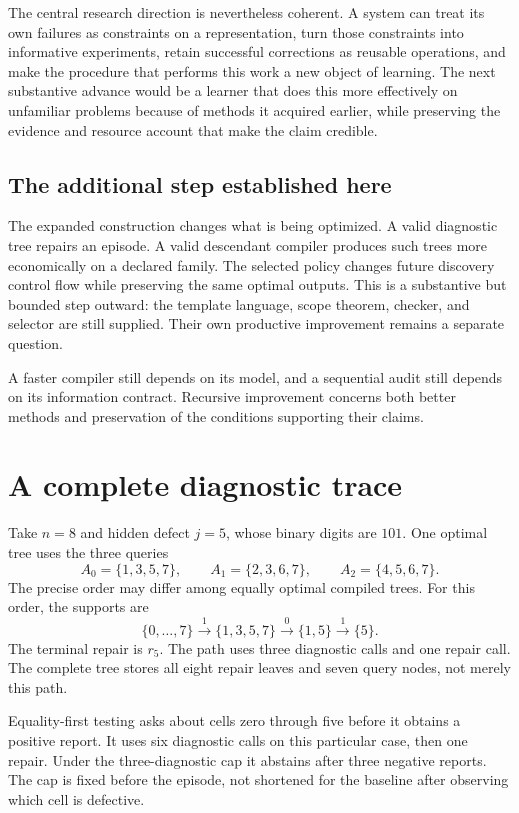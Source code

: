 \documentclass[11pt,letterpaper]{article}
\theoremstyle{plain}
\theoremstyle{definition}
\begin{document}
The central research direction is nevertheless coherent. A system can treat its own failures as constraints on a representation, turn those constraints into informative experiments, retain successful corrections as reusable operations, and make the procedure that performs this work a new object of learning. The next substantive advance would be a learner that does this more effectively on unfamiliar problems because of methods it acquired earlier, while preserving the evidence and resource account that make the claim credible.


\subsection{The additional step established here}
The expanded construction changes what is being optimized. A valid diagnostic tree repairs an episode. A valid descendant compiler produces such trees more economically on a declared family. The selected policy changes future discovery control flow while preserving the same optimal outputs. This is a substantive but bounded step outward: the template language, scope theorem, checker, and selector are still supplied. Their own productive improvement remains a separate question.

A faster compiler still depends on its model, and a sequential audit still depends on its information contract. Recursive improvement concerns both better methods and preservation of the conditions supporting their claims.

\clearpage\appendix
\section{A complete diagnostic trace}\label{app:trace}
Take $n=8$ and hidden defect $j=5$, whose binary digits are $101$. One optimal tree uses the three queries
\[
A_0=\{1,3,5,7\},\qquad A_1=\{2,3,6,7\},\qquad A_2=\{4,5,6,7\}.
\]
The precise order may differ among equally optimal compiled trees. For this order, the supports are
\[
\{0,\ldots,7\}\xrightarrow{1}\{1,3,5,7\}
\xrightarrow{0}\{1,5\}\xrightarrow{1}\{5\}.
\]
The terminal repair is $r_5$. The path uses three diagnostic calls and one repair call. The complete tree stores all eight repair leaves and seven query nodes, not merely this path.

Equality-first testing asks about cells zero through five before it obtains a positive report. It uses six diagnostic calls on this particular case, then one repair. Under the three-diagnostic cap it abstains after three negative reports. The cap is fixed before the episode, not shortened for the baseline after observing which cell is defective.
\end{document}
